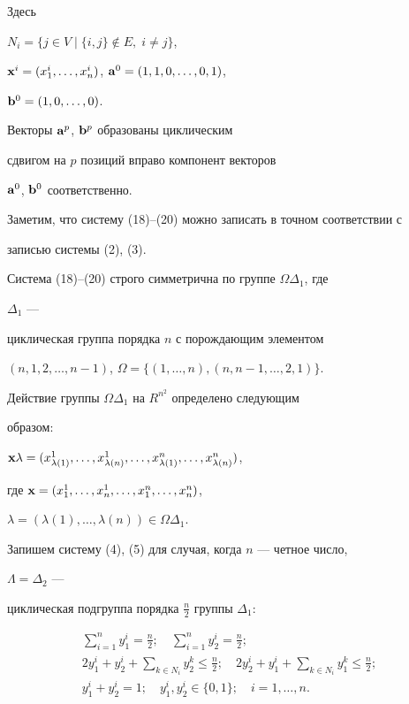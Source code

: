 Здесь


$N_i=\{j\in V\mid\{i,j\}\notin E,\;i\ne j\}$,


$\bold x^i=(x^i_1,\dotsc,x^i_n)$, $\bold a^0=(1,1,0,\dotsc,0,1)$,


$\bold b^0=(1,0,\dotsc,0)$.


Векторы $\bold a^p$, $\bold b^p$ образованы циклическим


сдвигом на $p$ позиций вправо компонент векторов


$\bold a^0$, $\bold b^0$ соответственно.





Заметим, что систему (18)--(20) можно записать в точном соответствии с


записью системы (2), (3).





Система (18)--(20) строго симметрична по группе $\Omega\Delta_1$, где


$\Delta_1$ ---


циклическая группа порядка $n$ с порождающим элементом


$(n,1,2,\dotsc,n-1)$, $\Omega=\{(1,\dotsc,n),(n,n-1,\dotsc,2,1)\}$.


Действие группы $\Omega\Delta_1$ на $R^{n^2}$ определено следующим


образом:


$\bold x\lambda=(x^1_{\lambda(1)},\dotsc,x^1_{\lambda(n)},\dotsc,


x^n_{\lambda(1)},\dotsc,x^n_{\lambda(n)})$,


где $\bold x=(x^1_1,\dotsc,x^1_n,\dotsc,x^n_1,\dotsc,x^n_n)$,


$\lambda=(\lambda(1),\dotsc,\lambda(n))\in\Omega\Delta_1$.


Запишем систему (4), (5) для случая, когда $n$ --- четное число,


$\Lambda=\Delta_2$ ---


циклическая подгруппа порядка $\frac{n}{2}$ группы $\Delta_1$:


\begin{gather}


\sum^n_{i=1}y^i_1=\frac{n}{2};\quad


\sum^n_{i=1}y^i_2=\frac{n}{2};\\


2y^i_1+y^i_2+\sum_{k\in N_i}y^k_2\le\frac{n}{2};\quad


2y^i_2+y^i_1+\sum_{k\in N_i}y^k_1\le\frac{n}{2};\\


y^i_1+y^i_2=1;\quad y^i_1,y^i_2\in\{0,1\};\quad


i=1,\dotsc,n.


\end{gather}






